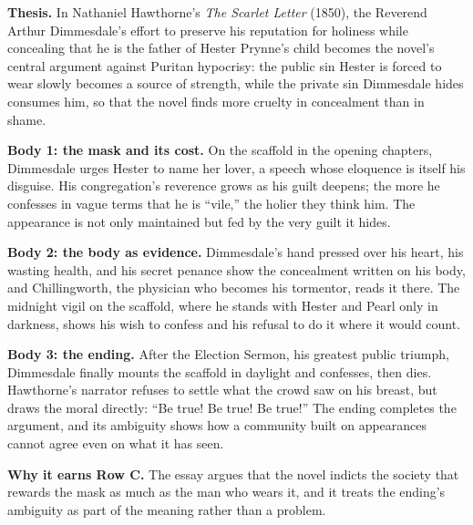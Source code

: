 \documentclass[11pt]{article}
\begin{document}
\begin{modelessay}
\textbf{Thesis.} In Nathaniel Hawthorne's \emph{The Scarlet Letter} (1850), the Reverend Arthur Dimmesdale's effort to preserve his reputation for holiness while concealing that he is the father of Hester Prynne's child becomes the novel's central argument against Puritan hypocrisy: the public sin Hester is forced to wear slowly becomes a source of strength, while the private sin Dimmesdale hides consumes him, so that the novel finds more cruelty in concealment than in shame.

\textbf{Body 1: the mask and its cost.} On the scaffold in the opening chapters, Dimmesdale urges Hester to name her lover, a speech whose eloquence is itself his disguise. His congregation's reverence grows as his guilt deepens; the more he confesses in vague terms that he is ``vile,'' the holier they think him. The appearance is not only maintained but fed by the very guilt it hides.

\textbf{Body 2: the body as evidence.} Dimmesdale's hand pressed over his heart, his wasting health, and his secret penance show the concealment written on his body, and Chillingworth, the physician who becomes his tormentor, reads it there. The midnight vigil on the scaffold, where he stands with Hester and Pearl only in darkness, shows his wish to confess and his refusal to do it where it would count.

\textbf{Body 3: the ending.} After the Election Sermon, his greatest public triumph, Dimmesdale finally mounts the scaffold in daylight and confesses, then dies. Hawthorne's narrator refuses to settle what the crowd saw on his breast, but draws the moral directly: ``Be true! Be true! Be true!'' The ending completes the argument, and its ambiguity shows how a community built on appearances cannot agree even on what it has seen.

\textbf{Why it earns Row C.} The essay argues that the novel indicts the society that rewards the mask as much as the man who wears it, and it treats the ending's ambiguity as part of the meaning rather than a problem.
\end{modelessay}
\end{document}
